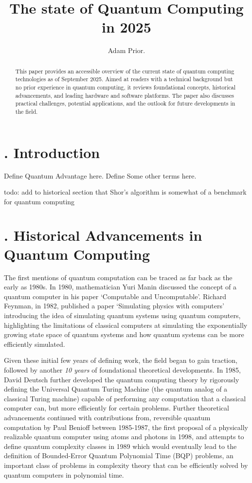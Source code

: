\documentclass{elbioimp2}
\title{The state of Quantum Computing in 2025}
\author{Adam Prior.\affiliation{UrbanFox, Dublin, Ireland}}
\begin{document}
\setcounter{secnumdepth}{2}


\maketitle

\begin{abstract}
  This paper provides an accessible overview of the current state of quantum computing technologies
  as of September 2025. Aimed at readers with a technical background but no prior experience in quantum
  computing, it reviews foundational concepts, historical advancements, and leading hardware and software platforms. The paper
  also discusses practical challenges, potential applications, and the outlook for future developments in the field.

\end{abstract}

\section{. Introduction}
Define Quantum Advantage here.
Define Some other terms here.

todo: add to historical section that Shor's algorithm is somewhat of a benchmark for quantum computing


\section{. Historical Advancements in Quantum Computing}
The first mentions of quantum computation can be traced as far back as the early as 1980s.
In 1980, mathematician Yuri Manin discussed the concept of a quantum computer in his paper
`Computable and Uncomputable'\cite{Manin1980}. Richard Feynman, in 1982, published a paper
`Simulating physics with computers' introducing the idea of simulating
quantum systems using quantum computers\cite{Feynman1982}, highlighting the limitations
of classical computers at simulating the exponentially growing state space of quantum
systems and how quantum systems can be more efficiently simulated. 

Given these initial few years of defining work, the field began
to gain traction, followed by another \textit{10 years} of foundational theoretical developments.
In 1985, David Deutsch further developed the quantum computing theory by rigorously defining the  
Universal Quantum Turing Machine (the quantum analog of a classical Turing machine) capable of
performing any computation that a classical computer can, but more efficiently for certain problems\cite{Deutsch1985}. 
Further theoretical advancements continued with contributions from, reversible quantum computation by Paul Benioff between
1985-1987\cite{BBenioff1987}, the first proposal of a physically realizable quantum computer 
using atoms and photons in 1998\cite{Yamamoto1998}, and attempts to define quantum complexity 
classes in 1989\cite{Bernstein1993} which would eventually lead to the definition of 
Bounded-Error Quantum Polynomial Time (BQP) problems, an important class of problems in complexity
theory that can be efficiently solved by quantum computers in polynomial time.
\end{document}
